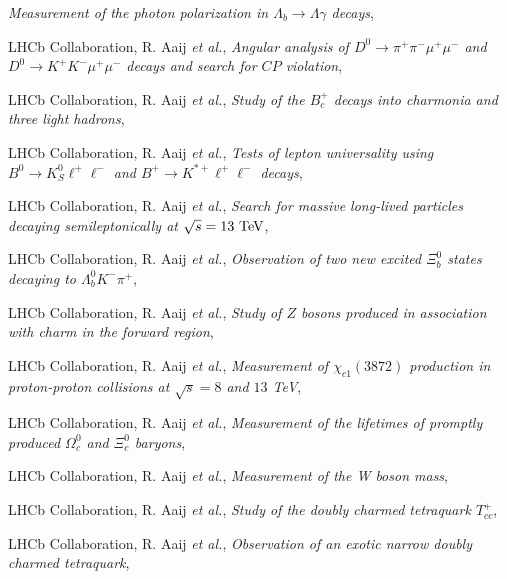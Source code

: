 \begin{cvcontent}
\begin{enumerate}[label={[\arabic*]}, leftmargin=1.5cm]
    \emph{Measurement of the photon polarization in $\Lambda_b \to \Lambda \gamma$ decays},
    \sloppy
    \item LHCb Collaboration, R. Aaij \emph{et al.}, 
    \emph{Angular analysis of $D^0 \to \pi^+\pi^-\mu^+\mu^-$ and $D^0 \to K^+K^-\mu^+\mu^-$ decays and search for $CP$ violation},
    \item LHCb Collaboration, R. Aaij \emph{et al.}, 
    \emph{Study of the $B_c^+$ decays into charmonia and three light hadrons},
    \item LHCb Collaboration, R. Aaij \emph{et al.}, 
    \emph{Tests of lepton universality using $B^0\to K^0_S \ell^+ \ell^-$ and $B^+\to K^{*+}\ell^+\ell^-$ decays},
    \item LHCb Collaboration, R. Aaij \emph{et al.}, 
    \emph{Search for massive long-lived particles decaying semileptonically at $\sqrt{s} = 13~\rm{TeV}$},
    \item LHCb Collaboration, R. Aaij \emph{et al.}, 
    \emph{Observation of two new excited $\Xi_b^0$ states decaying to  $\Lambda_b^0 K^- \pi^+$}, 
    \item LHCb Collaboration, R. Aaij \emph{et al.}, 
    \emph{Study of $Z$ bosons produced in association with charm in the forward region}, 
    \item LHCb Collaboration, R. Aaij \emph{et al.}, 
    \emph{Measurement of $\chi_{c1}(3872)$ production in proton-proton collisions at $\sqrt{s}=8$ and $13$ TeV}, 
    \item LHCb Collaboration, R. Aaij \emph{et al.}, 
    \emph{Measurement of the lifetimes of promptly produced $\Omega^{0}_{c}$ and $\Xi^{0}_{c}$ baryons},
    \item LHCb Collaboration, R. Aaij \emph{et al.}, 
    \emph{Measurement of the W boson mass}, 
    \sloppy
    \item LHCb Collaboration, R. Aaij \emph{et al.}, 
    \emph{Study of the doubly charmed tetraquark $T_{cc}^+$}, 
    \item LHCb Collaboration, R. Aaij \emph{et al.}, 
    \emph{Observation of an exotic narrow doubly charmed tetraquark}, 
  \end{enumerate}

\end{cvcontent}
